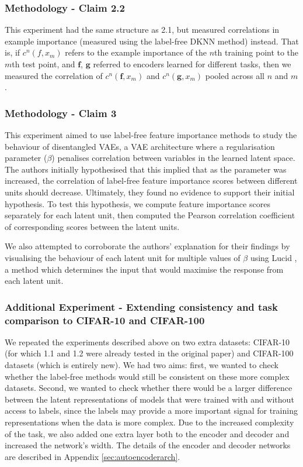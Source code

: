 \subsubsection{Methodology - Claim 2.2}
This experiment had the same structure as 2.1, but measured correlations in example importance (measured using the label-free DKNN method) instead. That is, if $c^n(f, x_m)$ refers to the example importance of the $n$th training point to the $m$th test point, and $\mathbf{f}$, $\mathbf{g}$ referred to encoders learned for different tasks, then we measured the correlation of  $c^n(\mathbf{f}, x_m)$ and $c^n(\mathbf{g}, x_m)$ pooled across all $n$ and $m$.

\subsubsection{Methodology - Claim 3} 
This experiment aimed to use label-free feature importance methods to study the behaviour of disentangled VAEs, a VAE architecture where a regularisation parameter ($\beta$) penalises correlation between variables in the learned latent space. The authors initially hypothesised that this implied that as the parameter was increased, the correlation of label-free feature importance scores between different units should decrease. Ultimately, they found no evidence to support their initial hypothesis. To test this hypothesis, we compute feature importance scores separately for each latent unit, then computed the Pearson correlation coefficient of corresponding scores between the latent units.  

We also attempted to corroborate the authors' explanation for their findings by visualising the behaviour of each latent unit for multiple values of $\beta$ using Lucid \cite{olah2017feature}, a method which determines the input that would maximise the response from each latent unit. 

\subsubsection{Additional Experiment - Extending consistency and task comparison to CIFAR-10 and CIFAR-100}

We repeated the experiments described above on two extra datasets: CIFAR-10 (for which 1.1 and 1.2 were already tested in the original paper) and CIFAR-100 datasets (which is entirely new). We had two aims: first, we wanted to check whether the label-free methods would still be consistent on these more complex datasets. Second, we wanted to check whether there would be a larger difference between the latent representations of models that were trained with and without access to labels, since the labels may provide a more important signal for training representations when the data is more complex. Due to the increased complexity of the task, we also added one extra layer both to the encoder and decoder and increased the network's width. The details of the encoder and decoder networks are described in Appendix \ref{sec:autoencoderarch}. 


